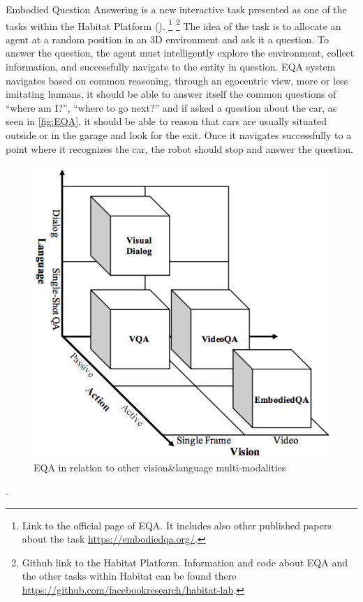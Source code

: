 Embodied Question Answering is a new interactive task presented as one of the tasks within the Habitat Platform (\cite{embodiedqa}). \footnote{Link to the official page of EQA. It includes also other published papers about the task \url{https://embodiedqa.org/}.} \footnote{Github link to the Habitat Platform. Information and code about EQA and the other tasks within Habitat can be found there \url{https://github.com/facebookresearch/habitat-lab}.} The idea of the task is to allocate an agent at a random position in an  3D environment and ask it a question. To answer the question, the agent must intelligently explore the environment, collect information, and successfully navigate to the entity in question. EQA system navigates based on common reasoning, through an egocentric view, more or less imitating humans, it should be able to answer itself the common questions of “where am I?”, “where to go next?” and if asked a question about the car, as seen in \ref{fig:EQA}, it should be able to reason that cars are usually situated outside or in the garage and look for the exit. Once it navigates successfully to a point where it recognizes the car, the robot should stop and answer the question.  


\begin{figure}[H]
\centering
\includegraphics[scale=0.3]{images/Vision-language.png}
\caption{EQA in relation to other vision&language multi-modalities}
\label{fig:multimodal}
\end{figure}.


